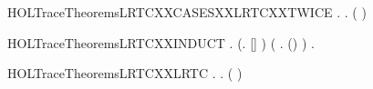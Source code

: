 \begin{SaveVerbatim}{HOLTraceTheoremsLRTCXXCASESXXLRTCXXTWICE}
\HOLTokenTurnstile{} \HOLSymConst{\HOLTokenForall{}}   .
            \HOLSymConst{\HOLTokenEquiv{}}
       \HOLSymConst{\HOLTokenExists{}}  .      \HOLSymConst{\HOLTokenConj{}}      \HOLSymConst{\HOLTokenConj{}} ( \HOLSymConst{=}  \HOLSymConst{++} )
\end{SaveVerbatim}
\newcommand{\HOLTraceTheoremsLRTCXXCASESXXLRTCXXTWICE}{\UseVerbatim{HOLTraceTheoremsLRTCXXCASESXXLRTCXXTWICE}}
\begin{SaveVerbatim}{HOLTraceTheoremsLRTCXXINDUCT}
\HOLTokenTurnstile{} \HOLSymConst{\HOLTokenForall{}} .
       (\HOLSymConst{\HOLTokenForall{}}.   [] ) \HOLSymConst{\HOLTokenConj{}}
       (\HOLSymConst{\HOLTokenForall{}}    .     \HOLSymConst{\HOLTokenConj{}}     \HOLSymConst{\HOLTokenImp{}}   (\HOLSymConst{::}) ) \HOLSymConst{\HOLTokenImp{}}
       \HOLSymConst{\HOLTokenForall{}}  .      \HOLSymConst{\HOLTokenImp{}}    
\end{SaveVerbatim}
\newcommand{\HOLTraceTheoremsLRTCXXINDUCT}{\UseVerbatim{HOLTraceTheoremsLRTCXXINDUCT}}
\begin{SaveVerbatim}{HOLTraceTheoremsLRTCXXLRTC}
\HOLTokenTurnstile{} \HOLSymConst{\HOLTokenForall{}}   .
            \HOLSymConst{\HOLTokenImp{}} \HOLSymConst{\HOLTokenForall{}} .      \HOLSymConst{\HOLTokenImp{}}    ( \HOLSymConst{++} ) 
\end{SaveVerbatim}
